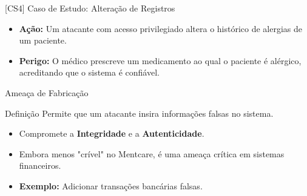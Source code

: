 \documentclass[aspectratio=169]{beamer}
\begin{document}
\begin{frame}{[CS4] Caso de Estudo: Alteração de Registros}
    \begin{itemize}
        \item \textbf{Ação:} Um atacante com acesso privilegiado altera o histórico de alergias de um paciente.
        \item \textbf{Perigo:} O médico prescreve um medicamento ao qual o paciente é alérgico, acreditando que o sistema é confiável.
    \end{itemize}
    \centering
\end{frame}

\begin{frame}{Ameaça de Fabricação}
    \begin{block}{Definição}
        Permite que um atacante insira informações falsas no sistema.
    \end{block}
    \begin{itemize}
        \item Compromete a \textbf{Integridade} e a \textbf{Autenticidade}.
        \item Embora menos "crível" no Mentcare, é uma ameaça crítica em sistemas financeiros.
        \item \textbf{Exemplo:} Adicionar transações bancárias falsas.
    \end{itemize}
\end{frame}
\end{document}

